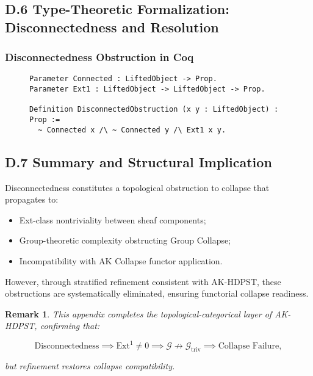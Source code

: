 \documentclass[11pt]{article}
\newtheorem{remark}[theorem]{Remark}
\begin{document}
\subsection*{D.6 Type-Theoretic Formalization: Disconnectedness and Resolution}

\subsubsection*{Disconnectedness Obstruction in Coq}

\begin{figure}[h]
\centering
\begin{lstlisting}[language=Coq, caption=Disconnectedness Obstruction Predicate]
Parameter Connected : LiftedObject -> Prop.
Parameter Ext1 : LiftedObject -> LiftedObject -> Prop.

Definition DisconnectedObstruction (x y : LiftedObject) : Prop :=
  ~ Connected x /\ ~ Connected y /\ Ext1 x y.
\end{lstlisting}
\end{figure}

\subsection*{D.7 Summary and Structural Implication}

Disconnectedness constitutes a topological obstruction to collapse that propagates to:

\begin{itemize}
    \item Ext-class nontriviality between sheaf components;
    \item Group-theoretic complexity obstructing Group Collapse;
    \item Incompatibility with AK Collapse functor application.
\end{itemize}

However, through stratified refinement consistent with AK-HDPST, these obstructions are systematically eliminated, ensuring functorial collapse readiness.

\begin{remark}
This appendix completes the topological-categorical layer of AK-HDPST, confirming that:

\[
\text{Disconnectedness} \implies \mathrm{Ext}^1 \neq 0 \implies \mathcal{G} \not\rightarrow \mathcal{G}_{\mathrm{triv}} \implies \text{Collapse Failure},
\]

but refinement restores collapse compatibility.

\end{remark}
\end{document}
